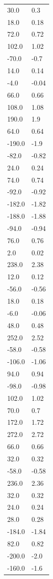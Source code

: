 \begin{longtable}{ll}
30.0 & 0.3 \\
18.0 & 0.18 \\
72.0 & 0.72 \\
102.0 & 1.02 \\
-70.0 & -0.7 \\
14.0 & 0.14 \\
-4.0 & -0.04 \\
66.0 & 0.66 \\
108.0 & 1.08 \\
190.0 & 1.9 \\
64.0 & 0.64 \\
-190.0 & -1.9 \\
-82.0 & -0.82 \\
24.0 & 0.24 \\
74.0 & 0.74 \\
-92.0 & -0.92 \\
-182.0 & -1.82 \\
-188.0 & -1.88 \\
-94.0 & -0.94 \\
76.0 & 0.76 \\
2.0 & 0.02 \\
238.0 & 2.38 \\
12.0 & 0.12 \\
-56.0 & -0.56 \\
18.0 & 0.18 \\
-6.0 & -0.06 \\
48.0 & 0.48 \\
252.0 & 2.52 \\
-58.0 & -0.58 \\
-106.0 & -1.06 \\
94.0 & 0.94 \\
-98.0 & -0.98 \\
102.0 & 1.02 \\
70.0 & 0.7 \\
172.0 & 1.72 \\
272.0 & 2.72 \\
66.0 & 0.66 \\
32.0 & 0.32 \\
-58.0 & -0.58 \\
236.0 & 2.36 \\
32.0 & 0.32 \\
24.0 & 0.24 \\
28.0 & 0.28 \\
-184.0 & -1.84 \\
82.0 & 0.82 \\
-200.0 & -2.0 \\
-160.0 & -1.6 \\

\end{longtable}
